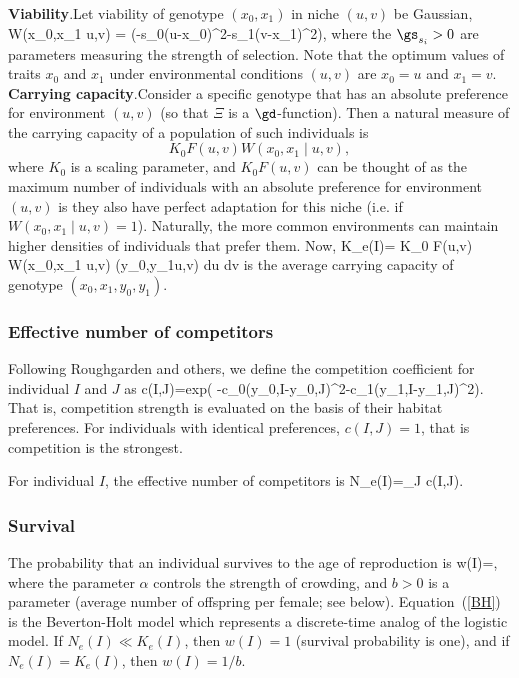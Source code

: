 \documentclass{article}
\begin{document}
{\bf Viability}.\quad Let viability of genotype $(x_0,x_1)$ in niche $(u,v)$ be Gaussian,
\be
		W(x_0,x_1 \mid u,v) = \exp(-s_0(u-x_0)^2-s_1(v-x_1)^2),
\ee
where the $\gs_{s_i}>0$ are parameters measuring the strength of
selection.  Note that the optimum values of traits $x_0$ and $x_1$
under environmental conditions $(u,v)$ are $x_0 = u$ and $x_1 = v$.\\

{\bf Carrying capacity}.\quad Consider a specific genotype that has an absolute
preference for environment $(u,v)$ (so that $\Xi$ is a $\gd$-function). Then a natural
measure of the carrying capacity of a population of such individuals is
\[
    K_0 F(u,v) W(x_0,x_1 \mid u,v),
\]
where $K_0$ is a scaling parameter, and $K_0 F(u,v)$ can be thought of as the maximum
number of individuals with an absolute preference for environment $(u,v)$ is they
also have perfect adaptation for this niche (i.e. if $W(x_0,x_1 \mid u,v)=1$).
Naturally, the more common environments can maintain higher densities of individuals
that prefer them. Now,
\be
    K_e(I)= K_0 \int \int F(u,v) W(x_0,x_1 \mid u,v) \Xi(y_0,y_1\mid u,v) du dv
\ee
is the average carrying capacity of genotype $(x_0,x_1, y_0, y_1)$.


\subsubsection{Effective number of competitors}

Following Roughgarden and others, we define the competition coefficient for individual $I$ and $J$
as
\bs
\be
c(I,J)=exp( -c_0(y_{0,I}-y_{0,J})^2-c_1(y_{1,I}-y_{1,J})^2).
\ee
That is, competition strength is evaluated  on the basis of their habitat preferences.
For individuals with identical preferences, $c(I,J)=1$, that is competition is the strongest.

For individual $I$, the effective number of competitors is 
\be
N_e(I)=\sum_J c(I,J).
\ee
\es

\subsubsection{Survival}

The probability that an individual survives to the age of reproduction is
	\be \label{BH}
		w(I)=,
	\ee
where the parameter $\alpha$ controls the strength of
crowding, and $b>0$ is a parameter (average number of offspring per female;
see below).  Equation~(\ref{BH}) is the Beverton-Holt model which
represents a discrete-time analog of the logistic model. If $N_e(I)\ll
K_e(I)$, then $w(I)=1$ (survival probability is one), and if
$N_e(I)=K_e(I)$, then $w(I)=1/b$.
\end{document}
